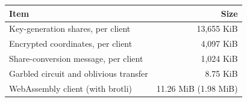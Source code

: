 \begin{tabular}{lr}
\hline
Item & Size \\
\hline
Key-generation shares, per client & 13,655 KiB \\
Encrypted coordinates, per client & 4,097 KiB \\
Share-conversion message, per client & 1,024 KiB \\
Garbled circuit and oblivious transfer & 8.75 KiB \\
WebAssembly client (with brotli) & 11.26 MiB (1.98 MiB) \\
\hline
\end{tabular}
